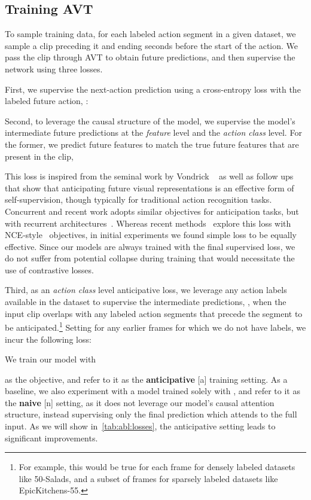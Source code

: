 \documentclass[10pt,twocolumn,letterpaper]{article}
\newcommand{\ekfull}{EpicKitchens-55\xspace}
\newcommand{\saladfull}{50-Salads\xspace}
\newcommand{\method}{AVT\xspace}
\newcommand{\causalSetting}{anticipative\xspace}
\newcommand{\causalSettingShort}{[a]\xspace}
\newcommand{\acausalSetting}{naive\xspace}
\newcommand{\acausalSettingShort}{[n]\xspace}
\newcommand{\lossBoth}{anticipative\xspace}
\begin{document}
\subsection{Training \method} 

To sample training data, for each labeled action segment in a given dataset, we sample a clip preceding it and ending  seconds before the start of the action. We pass the clip through \method to obtain future predictions, and then supervise the network using three losses. 

First, we supervise the next-action prediction using a cross-entropy loss with the labeled future action, :

Second, to leverage the causal structure of the model, we supervise the model's intermediate future predictions at the \emph{feature} level and the \emph{action class} level.  For the former, we predict future features to match the true future features that are present in the clip, \ie

This loss is inspired from the seminal work by Vondrick \etal~\cite{vondrick2016anticipating} as well as follow ups~\cite{han2019dpc,han2020memdpc} that show that anticipating future visual representations is an effective form of self-supervision, though typically for traditional action recognition tasks.
Concurrent and recent work adopts similar objectives for anticipation tasks, but with recurrent architectures~\cite{wu2021imaginernn,shi2018action,gammulle2019predicting}.  Whereas recent methods~\cite{han2019dpc,han2020memdpc,wu2021imaginernn} explore this loss with NCE-style~\cite{oord2018representation} objectives, in initial experiments we found simple  loss to be equally effective. Since our models are always trained with the final supervised loss, we do not suffer from potential collapse during training that would necessitate the use of contrastive losses.

Third, as an \emph{action class} level \lossBoth loss, we leverage any action labels available in the dataset to supervise the intermediate predictions, \ie, when the input clip overlaps with any labeled action segments that precede the segment to be anticipated.\footnote{For example, this would be true for each frame for densely labeled datasets like \saladfull, and a subset of frames for sparsely labeled datasets like \ekfull.} Setting  for any earlier frames for which we do not have labels, we incur the following loss:

We train our model with 

as the objective, and refer to it as the {\bf \causalSetting} \causalSettingShort training setting. As a baseline, we also experiment with a model trained solely with , and refer to it as the {\bf \acausalSetting} \acausalSettingShort setting, as it does not leverage our model's causal attention structure, instead supervising only the final prediction which attends to the full input. 
As we will show in~\cref{tab:abl:losses}, the \causalSetting setting leads to significant improvements. 
\end{document}
